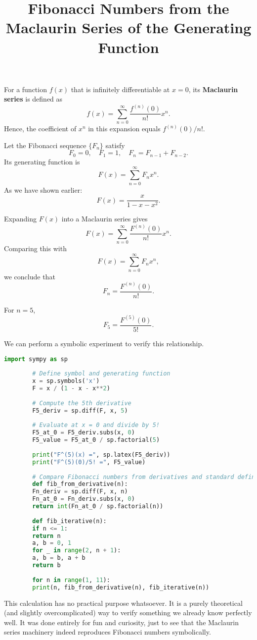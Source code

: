 \documentclass[a4paper,12pt]{article}
\title{Fibonacci Numbers from the Maclaurin Series of the Generating Function}
\author{}
\date{}
\begin{document}
	\maketitle
	
	For a function \( f(x) \) that is infinitely differentiable at \( x=0 \),
	its \textbf{Maclaurin series} is defined as
	\[
	f(x) = \sum_{n=0}^{\infty} \frac{f^{(n)}(0)}{n!} x^n.
	\]
	Hence, the coefficient of \(x^n\) in this expansion equals \( f^{(n)}(0)/n! \).
	
	Let the Fibonacci sequence \(\{F_n\}\) satisfy
	\[
	F_0 = 0, \quad F_1 = 1, \quad F_{n} = F_{n-1} + F_{n-2}.
	\]
	Its generating function is
	\[
	F(x) = \sum_{n=0}^{\infty} F_n x^n.
	\]
	As we have shown earlier:
	\[
	F(x) = \frac{x}{1 - x - x^2}.
	\]
	
	Expanding \(F(x)\) into a Maclaurin series gives
	\[
	F(x) = \sum_{n=0}^{\infty} \frac{F^{(n)}(0)}{n!} x^n.
	\]
	Comparing this with
	\[
	F(x) = \sum_{n=0}^{\infty} F_n x^n,
	\]
	we conclude that
	\[
	F_n = \frac{F^{(n)}(0)}{n!}.
	\]
	
	For \( n = 5 \),
	\[
	F_5 = \frac{F^{(5)}(0)}{5!}.
	\]
	
	We can perform a symbolic experiment to verify this relationship.
	
	\begin{lstlisting}[language=Python, caption={Symbolic verification in Python (SymPy)}]
		import sympy as sp
		
		# Define symbol and generating function
		x = sp.symbols('x')
		F = x / (1 - x - x**2)
		
		# Compute the 5th derivative
		F5_deriv = sp.diff(F, x, 5)
		
		# Evaluate at x = 0 and divide by 5!
		F5_at_0 = F5_deriv.subs(x, 0)
		F5_value = F5_at_0 / sp.factorial(5)
		
		print("F^(5)(x) =", sp.latex(F5_deriv))
		print("F^(5)(0)/5! =", F5_value)
		
		# Compare Fibonacci numbers from derivatives and standard definition
		def fib_from_derivative(n):
		Fn_deriv = sp.diff(F, x, n)
		Fn_at_0 = Fn_deriv.subs(x, 0)
		return int(Fn_at_0 / sp.factorial(n))
		
		def fib_iterative(n):
		if n <= 1:
		return n
		a, b = 0, 1
		for _ in range(2, n + 1):
		a, b = b, a + b
		return b
		
		for n in range(1, 11):
		print(n, fib_from_derivative(n), fib_iterative(n))
	\end{lstlisting}


This calculation has no practical purpose whatsoever.  
It is a purely theoretical (and slightly overcomplicated) way to verify something we already know perfectly well.  
It was done entirely for fun and curiosity, just to see that the Maclaurin series machinery indeed reproduces Fibonacci numbers symbolically.
	
\end{document}
